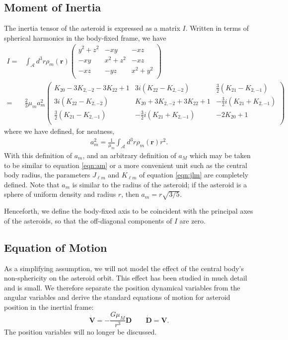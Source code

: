 \documentclass[linenumbers]{aastex631}
\newcommand{\parens}[1]{\left( #1 \right)}
\begin{document}
\subsection{Moment of Inertia}
The inertia tensor of the asteroid is expressed as a matrix $I$. Written in terms of spherical harmonics in the body-fixed frame, we have
\begin{eqnarray}
I = &\int_\mathcal{A} d^3 r\rho_m(\bm r) \parens{\begin{array}{ccc}
y^2 + z^2 & -xy & -xz \\
-xy & x^2 + z^2 & -xz \\
-xz & -yz & x^2 + y^2 \\
\end{array}}\\
= &\frac{2}{3}\mu_m a_m^2\parens{\begin{array}{ccc}
K_{20}-3K_{2,-2}-3K_{22}+1 & 3i \parens{K_{22}-K_{2,-2}} & \frac{3}{2}\parens{K_{21}-K_{2,-1}}\\
3i \parens{K_{22}-K_{2,-2}} & K_{20}+3K_{2,-2}+3K_{22}+1 & -\frac{3}{2}i\parens{K_{21}+K_{2,-1}}\\
\frac{3}{2}\parens{K_{21}-K_{2,-1}} & -\frac{3}{2}i\parens{K_{21}+K_{2,-1}} & -2K_{20}+1\\
\end{array}}
\label{eqn:moi}
\end{eqnarray}
where we have defined, for neatness,
\begin{eqnarray}
a_m^2=\frac{1}{\mu_m}\int_\mathcal{A} d^3 r \rho_m(\bm r) r^2.
\label{eqn:am}
\end{eqnarray}
With this definition of $a_m$, and an arbitrary definition of $a_M$ which may be taken to be similar to equation \ref{eqn:am} or a more convenient unit such as the central body radius, the parameters $J_{\ell m}$ and $K_{\ell m}$ of equation \ref{eqn:jlm} are completely defined. Note that $a_m$ is similar to the radius of the asteroid; if the asteroid is a sphere of uniform density and radius $r$, then $a_m = r\sqrt{3/5}$.

Henceforth, we define the body-fixed axis to be coincident with the principal axes of the asteroids, so that the off-diagonal components of $I$ are zero.

\subsection{Equation of Motion}
As a simplifying assumption, we will not model the effect of the central body's non-sphericity on the asteroid orbit. This effect has been studied in much detail and is small. We therefore separate the position dynamical variables from the angular variables and derive the standard equations of motion for asteroid position in the inertial frame:
\begin{equation}
\dot{\bm{V}} = -\frac{G\mu_M}{r^3}\bm{D}\qquad \dot{\bm{D}} = \bm{V}.
\label{eqn:translaton-eom}
\end{equation}
The position variables will no longer be discussed.
\end{document}
